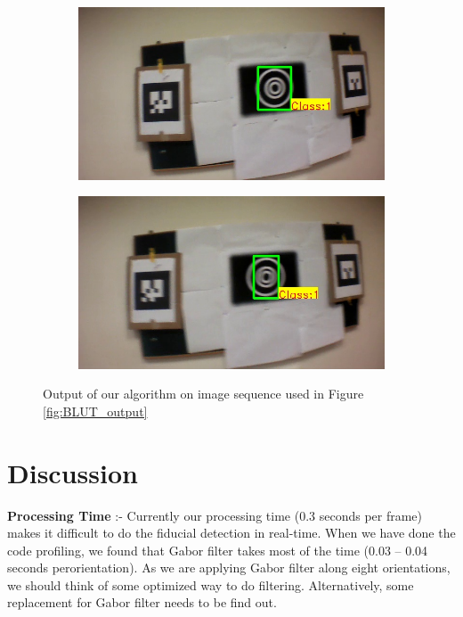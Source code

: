 \documentclass[runningheads]{llncs}
\begin{document}
\begin{figure}
\begin{subfigure}[b]{.19\textwidth}
\end{subfigure}
\begin{subfigure}[b]{.19\textwidth}
\includegraphics[width=\linewidth]{output14.jpg}
\end{subfigure}
\begin{subfigure}[b]{.19\textwidth}
\includegraphics[width=\linewidth]{output15.jpg}
\end{subfigure}
\caption{Output of our algorithm on image sequence used in
Figure \ref{fig:BLUT_output}}
\label{fig:our_output}
\end{figure}

\section{Discussion}

\textbf{Processing Time} :-  Currently our processing time (0.3 seconds per
frame) makes it difficult to do the fiducial detection in real-time. When we have
done the code profiling, we found that Gabor filter takes most of the time (0.03
-- 0.04 seconds perorientation). As we are applying Gabor filter along eight
orientations, we should think of some optimized way to do filtering.
Alternatively, some replacement for Gabor filter needs to be find out.  
\end{document}
